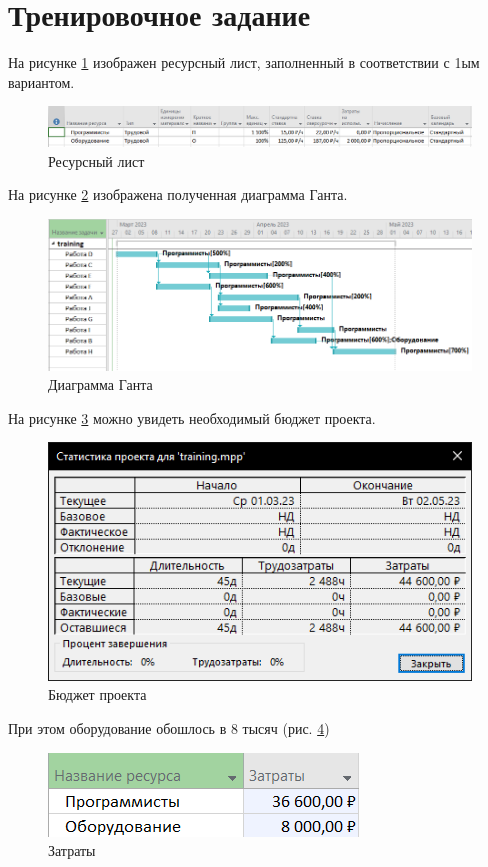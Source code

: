 \section*{Тренировочное задание}

На рисунке \ref{p1} изображен ресурсный лист, заполненный в соответствии с 1ым вариантом.
\begin{figure}[!h]
	\centering
	\includegraphics[width=1\linewidth]{inc/img/1.png}
	\caption{Ресурсный лист}
	\label{p1}
\end{figure}

На рисунке \ref{p2} изображена полученная диаграмма Ганта.
\begin{figure}[!h]
	\includegraphics[width=1\linewidth]{inc/img/2.png}
	\caption{Диаграмма Ганта}
	\label{p2}
\end{figure}

На рисунке \ref{p3} можно увидеть необходимый бюджет проекта.
\begin{figure}[!h]
	\centering
	\includegraphics[width=0.7\linewidth]{inc/img/3.png}
	\caption{Бюджет проекта}
	\label{p3}
\end{figure}

\newpage
При этом оборудование обошлось в 8 тысяч (рис. \ref{p33})
\begin{figure}[!h]
	\centering
	\includegraphics[width=0.7\linewidth]{inc/img/3.0.png}
	\caption{Затраты}
	\label{p33}
\end{figure}


